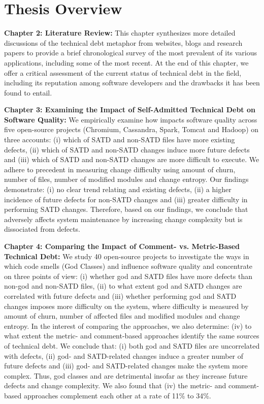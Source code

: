 \section{Thesis Overview}

\textbf{Chapter 2: Literature Review:} This chapter synthesizes more detailed discussions of the technical debt metaphor from websites, blogs and research papers to provide a brief chronological survey of the most prevalent of its various applications, including some of the most recent.  At the end of this chapter, we offer a critical assessment of the current status of technical debt in the field, including its reputation among software developers and the drawbacks it has been found to entail.

\textbf{Chapter 3: Examining the Impact of Self-Admitted Technical Debt on Software Quality:} We empirically examine how \SATD impacts software quality across five open-source projects (Chromium, Cassandra, Spark, Tomcat and Hadoop) on three accounts: (i) which of SATD and non-SATD files have more existing defects, (ii) which of SATD and non-SATD changes induce more future defects and (iii) which of SATD and non-SATD changes are more difficult to execute. We adhere to precedent in measuring change difficulty using amount of churn, number of files, number of modified modules and change entropy. Our findings demonstrate: (i) no clear trend relating \SATD and existing defects, (ii) a higher incidence of future defects for non-SATD changes and (iii) greater difficulty in performing SATD changes. Therefore, based on our findings, we conclude that \SATD adversely affects system maintenance by increasing change complexity but is dissociated from defects.

\textbf{Chapter 4: Comparing the Impact of Comment- vs. Metric-Based Technical Debt:} We study 40 open-source projects to investigate the ways in which code smells (God Classes) and \SATD influence software quality and concentrate on three points of view: (i) whether god and SATD files have more defects than non-god and non-SATD files, (ii) to what extent god and SATD changes are correlated with future defects and (iii) whether performing god and SATD changes imposes more difficulty on the system, where difficulty is measured by amount of churn, number of affected files and modified modules and change entropy. In the interest of comparing the approaches, we also determine: (iv) to what extent the metric- and comment-based approaches identify the same sources of technical debt. We conclude that: (i) both god and SATD files are uncorrelated with defects, (ii) god- and SATD-related changes induce a greater number of future defects and (iii) god- and SATD-related changes make the system more complex. Thus, god classes and \SATD are detrimental insofar as they increase future defects and change complexity. We also found that (iv) the metric- and comment-based approaches complement each other at a rate of 11\% to 34\%.

